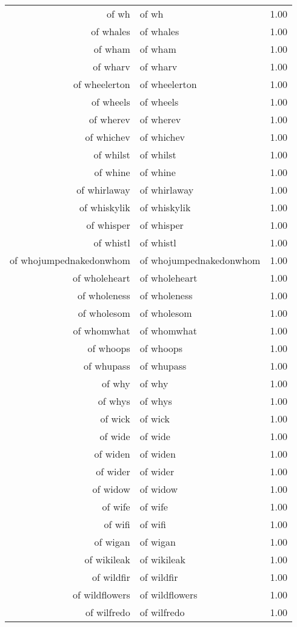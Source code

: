 \begin{table}[ht]
\begin{tabular}{rlr}
  of wh & of wh & 1.00 \\ 
  of whales & of whales & 1.00 \\ 
  of wham & of wham & 1.00 \\ 
  of wharv & of wharv & 1.00 \\ 
  of wheelerton & of wheelerton & 1.00 \\ 
  of wheels & of wheels & 1.00 \\ 
  of wherev & of wherev & 1.00 \\ 
  of whichev & of whichev & 1.00 \\ 
  of whilst & of whilst & 1.00 \\ 
  of whine & of whine & 1.00 \\ 
  of whirlaway & of whirlaway & 1.00 \\ 
  of whiskylik & of whiskylik & 1.00 \\ 
  of whisper & of whisper & 1.00 \\ 
  of whistl & of whistl & 1.00 \\ 
  of whojumpednakedonwhom & of whojumpednakedonwhom & 1.00 \\ 
  of wholeheart & of wholeheart & 1.00 \\ 
  of wholeness & of wholeness & 1.00 \\ 
  of wholesom & of wholesom & 1.00 \\ 
  of whomwhat & of whomwhat & 1.00 \\ 
  of whoops & of whoops & 1.00 \\ 
  of whupass & of whupass & 1.00 \\ 
  of why & of why & 1.00 \\ 
  of whys & of whys & 1.00 \\ 
  of wick & of wick & 1.00 \\ 
  of wide & of wide & 1.00 \\ 
  of widen & of widen & 1.00 \\ 
  of wider & of wider & 1.00 \\ 
  of widow & of widow & 1.00 \\ 
  of wife & of wife & 1.00 \\ 
  of wifi & of wifi & 1.00 \\ 
  of wigan & of wigan & 1.00 \\ 
  of wikileak & of wikileak & 1.00 \\ 
  of wildfir & of wildfir & 1.00 \\ 
  of wildflowers & of wildflowers & 1.00 \\ 
  of wilfredo & of wilfredo & 1.00 \\ 

\end{tabular}
\end{table}
